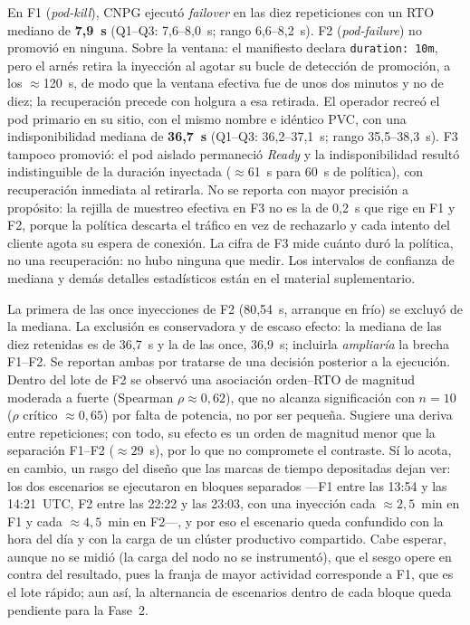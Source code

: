 En F1 (\textit{pod-kill}), CNPG ejecutó \textit{failover} en las diez repeticiones con un RTO mediano de \textbf{7,9~s} (Q1--Q3: 7,6--8,0~s; rango 6,6--8,2~s). F2 (\textit{pod-failure}) no promovió en ninguna. Sobre la ventana: el manifiesto declara \texttt{duration:\ 10m}, pero el arnés retira la inyección al agotar su bucle de detección de promoción, a los $\approx$120~s, de modo que la ventana efectiva fue de unos dos minutos y no de diez; la recuperación precede con holgura a esa retirada. El operador recreó el pod primario en su sitio, con el mismo nombre e idéntico PVC, con una indisponibilidad mediana de \textbf{36,7~s} (Q1--Q3: 36,2--37,1~s; rango 35,5--38,3~s). F3 tampoco promovió: el pod aislado permaneció \textit{Ready} y la indisponibilidad resultó indistinguible de la duración inyectada ($\approx$61~s para 60~s de política), con recuperación inmediata al retirarla. No se reporta con mayor precisión a propósito: la rejilla de muestreo efectiva en F3 no es la de 0,2~s que rige en F1 y F2, porque la política descarta el tráfico en vez de rechazarlo y cada intento del cliente agota su espera de conexión. La cifra de F3 mide cuánto duró la política, no una recuperación: no hubo ninguna que medir. Los intervalos de confianza de mediana y demás detalles estadísticos están en el material suplementario.

La primera de las once inyecciones de F2 (80,54~s, arranque en frío) se excluyó de la mediana. La exclusión es conservadora y de escaso efecto: la mediana de las diez retenidas es de 36,7~s y la de las once, 36,9~s; incluirla \emph{ampliaría} la brecha F1--F2. Se reportan ambas por tratarse de una decisión posterior a la ejecución. Dentro del lote de F2 se observó una asociación orden--RTO de magnitud moderada a fuerte (Spearman $\rho\approx 0{,}62$), que no alcanza significación con $n=10$ ($\rho$ crítico $\approx 0{,}65$) por falta de potencia, no por ser pequeña. Sugiere una deriva entre repeticiones; con todo, su efecto es un orden de magnitud menor que la separación F1--F2 ($\approx 29$~s), por lo que no compromete el contraste. Sí lo acota, en cambio, un rasgo del diseño que las marcas de tiempo depositadas dejan ver: los dos escenarios se ejecutaron en bloques separados —F1 entre las 13:54 y las 14:21~UTC, F2 entre las 22:22 y las 23:03, con una inyección cada $\approx 2{,}5$~min en F1 y cada $\approx 4{,}5$~min en F2—, y por eso el escenario queda confundido con la hora del día y con la carga de un clúster productivo compartido. Cabe esperar, aunque no se midió  (la carga del nodo no se instrumentó), que el sesgo opere en contra del resultado, pues la franja de mayor actividad corresponde a F1, que es el lote rápido; aun así, la alternancia de escenarios dentro de cada bloque queda pendiente para la Fase~2.

